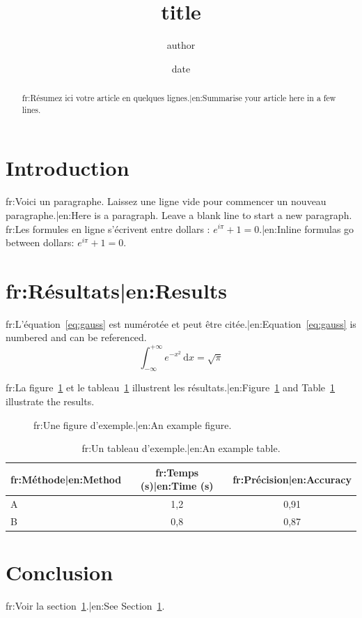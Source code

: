 \documentclass[11pt,a4paper]{article}
\title{{{title}}}
\author{{{author}}}
\date{{{date}}}
\begin{document}
\maketitle

\begin{abstract}
  {{fr:Résumez ici votre article en quelques lignes.|en:Summarise your article here in a few lines.}}
\end{abstract}

\section{Introduction}
\label{sec:introduction}

{{fr:Voici un paragraphe. Laissez une ligne vide pour commencer un nouveau paragraphe.|en:Here is a paragraph. Leave a blank line to start a new paragraph.}}
{{fr:Les formules en ligne s'écrivent entre dollars : $e^{i\pi} + 1 = 0$.|en:Inline formulas go between dollars: $e^{i\pi} + 1 = 0$.}}

\section{{{fr:Résultats|en:Results}}}
\label{sec:resultats}

{{fr:L'équation~\eqref{eq:gauss} est numérotée et peut être citée.|en:Equation~\eqref{eq:gauss} is numbered and can be referenced.}}
\begin{equation}
  \int_{-\infty}^{+\infty} e^{-x^2} \, \mathrm{d}x = \sqrt{\pi}
  \label{eq:gauss}
\end{equation}

{{fr:La figure~\ref{fig:exemple} et le tableau~\ref{tab:exemple} illustrent les résultats.|en:Figure~\ref{fig:exemple} and Table~\ref{tab:exemple} illustrate the results.}}

\begin{figure}[htbp]
  \centering
  \caption{{{fr:Une figure d'exemple.|en:An example figure.}}}
  \label{fig:exemple}
\end{figure}

\begin{table}[htbp]
  \centering
  \begin{tabular}{lcc}
    \toprule
    {{fr:Méthode|en:Method}} & {{fr:Temps (s)|en:Time (s)}} & {{fr:Précision|en:Accuracy}} \\
    \midrule
    A & 1{,}2 & 0{,}91 \\
    B & 0{,}8 & 0{,}87 \\
    \bottomrule
  \end{tabular}
  \caption{{{fr:Un tableau d'exemple.|en:An example table.}}}
  \label{tab:exemple}
\end{table}

\section{Conclusion}

{{fr:Voir la section~\ref{sec:introduction}.|en:See Section~\ref{sec:introduction}.}}
\end{document}
